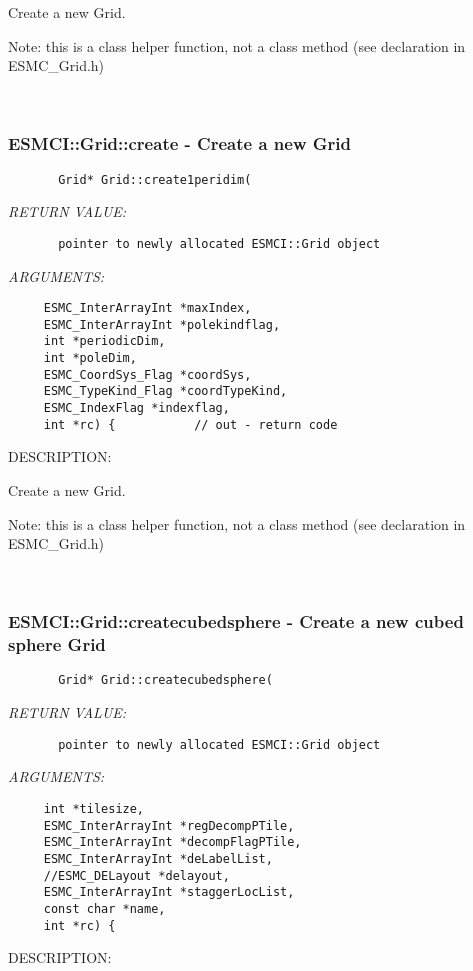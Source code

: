         Create a new Grid.
  
        Note: this is a class helper function, not a class method
        (see declaration in ESMC\_Grid.h)
   
 
\mbox{}\hrulefill\ 
 
\subsubsection [ESMCI::Grid::create] {ESMCI::Grid::create - Create a new Grid}


  
\begin{verbatim}       Grid* Grid::create1peridim(\end{verbatim}{\em RETURN VALUE:}
\begin{verbatim}       pointer to newly allocated ESMCI::Grid object\end{verbatim}{\em ARGUMENTS:}
\begin{verbatim}     ESMC_InterArrayInt *maxIndex, 
     ESMC_InterArrayInt *polekindflag,
     int *periodicDim,
     int *poleDim,
     ESMC_CoordSys_Flag *coordSys,
     ESMC_TypeKind_Flag *coordTypeKind,
     ESMC_IndexFlag *indexflag,
     int *rc) {           // out - return code\end{verbatim}
{\sf DESCRIPTION:\\ }


        Create a new Grid.
  
        Note: this is a class helper function, not a class method
        (see declaration in ESMC\_Grid.h)
   
 
\mbox{}\hrulefill\ 
 
\subsubsection [ESMCI::Grid::createcubedsphere] {ESMCI::Grid::createcubedsphere - Create a new cubed sphere Grid}


  
\begin{verbatim}       Grid* Grid::createcubedsphere(\end{verbatim}{\em RETURN VALUE:}
\begin{verbatim}       pointer to newly allocated ESMCI::Grid object\end{verbatim}{\em ARGUMENTS:}
\begin{verbatim}     int *tilesize,
     ESMC_InterArrayInt *regDecompPTile,
     ESMC_InterArrayInt *decompFlagPTile,
     ESMC_InterArrayInt *deLabelList,
     //ESMC_DELayout *delayout,
     ESMC_InterArrayInt *staggerLocList,
     const char *name,
     int *rc) {\end{verbatim}
{\sf DESCRIPTION:\\ }


